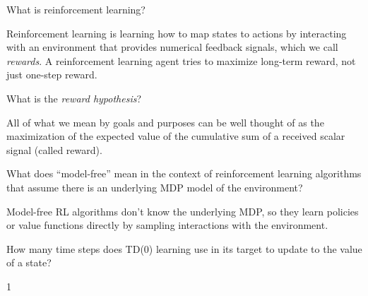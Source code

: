 \begin{questions}

\question What is reinforcement learning?

\begin{solution}[1in]
Reinforcement learning is learning how to map states to actions by interacting with an environment that provides numerical feedback signals, which we call {\it rewards}.  A reinforcement learning agent tries to maximize long-term reward, not just one-step reward.
\end{solution}

\question What is the {\it reward hypothesis}?

\begin{solution}[1in]
All of what we mean by goals and purposes can be well thought of as the maximization of the expected value of the cumulative sum of a received scalar signal (called reward).
\end{solution}


\question What does ``model-free'' mean in the context of reinforcement learning algorithms that assume there is an underlying MDP model of the environment?

\begin{solution}[1in]
Model-free RL algorithms don't know the underlying MDP, so they learn policies or value functions directly by sampling interactions with the environment.
\end{solution}

\question How many time steps does TD(0) learning use in its target to update to the value of a state?

\begin{solution}[.5in]
1
\end{solution}


\end{questions}


